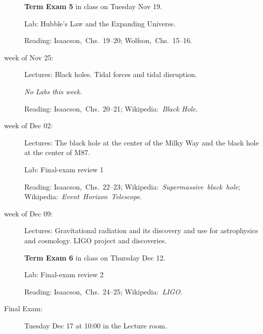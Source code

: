 \documentclass[12pt]{article}
\begin{document}
\begin{description}
  \textbf{Term Exam 5} in class on Tuesday Nov 19.

  Lab: Hubble's Law and the Expanding Universe.

  Reading: Isaacson,~Chs.~19--20;
           Wolfson,~Chs.~15--16.

\item[week of Nov 25:] Lectures: Black holes. Tidal forces and tidal
  disruption.

  \textsl{No Labs this week.}

  Reading: Isaacson,~Chs.~20--21;
  Wikipedia:~\textit{Black Hole}.

\item[week of Dec 02:] Lectures: The black hole at the center of the
  Milky Way and the black hole at the center of M87.

  Lab: Final-exam review 1

  Reading: Isaacson,~Chs.~22--23;
  Wikipedia:~\textit{Supermassive~black~hole};
  Wikipedia:~\textit{Event~Horizon~Telescope}.

\item[week of Dec 09:] Lectures: Gravitational radiation and its
  discovery and use for astrophysics and cosmology. LIGO project and
  discoveries.

  \textbf{Term Exam 6} in class on Thursday Dec 12.

  Lab: Final-exam review 2

  Reading: Isaacson,~Chs.~24--25;
  Wikipedia:~\textit{LIGO}.

\item[Final Exam:] Tuesday Dec 17 at 10:00 in the Lecture room.
\end{description}
\end{document}
